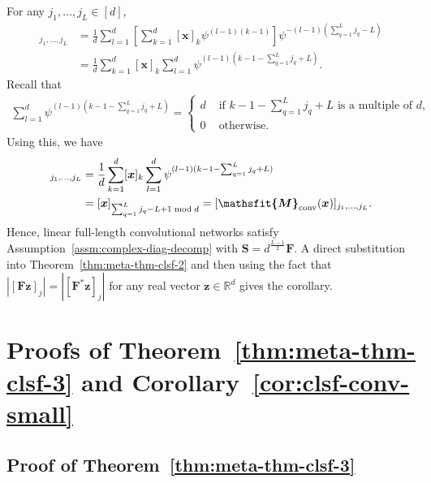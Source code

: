 \documentclass{article} %
\def\vx{{\bm{x}}}
\def\vz{{\bm{z}}}
\def\mF{{\bm{F}}}
\def\mS{{\bm{S}}}
\newcommand{\tens}[1]{\bm{\mathsfit{#1}}}
\def\tM{{\tens{M}}}
\newcommand{\R}{\mathbb{R}}
\newcommand{\tMconv}{\tM_{\rm conv}}
\begin{document}
For any $j_1, \dots, j_L \in [d]$,
\begin{align*}
    [\tM(\vx)]_{j_1, \dots, j_L} &= 
    \frac{1}{d} \sum_{l=1}^d \left [\sum_{k=1}^d [\vx]_k \psi^{(l-1)(k-1)} \right] \psi^{-(l-1)(\sum_{q=1}^L j_q - L)}\\
    &= \frac{1}{d} \sum_{k=1}^d [\vx]_k 
    \sum_{l=1}^d \psi^{(l-1)(k-1-\sum_{q=1}^L j_q + L)}.
\end{align*}
Recall that 
\begin{align*}
    \sum_{l=1}^d \psi^{(l-1)(k-1-\sum_{q=1}^L j_q + L)}
    = \begin{cases}
    d & \text{ if } k-1-\sum_{q=1}^L j_q + L \text{ is a multiple of $d$},\\
    0 & \text{ otherwise}.
    \end{cases}
\end{align*}
Using this, we have
\begin{align*}
    [\tM(\vx)]_{j_1, \dots, j_L} 
    &= \frac{1}{d} \sum_{k=1}^d [\vx]_k 
    \sum_{l=1}^d \psi^{(l-1)(k-1-\sum_{q=1}^L j_q + L)}\\
    &= [\vx]_{\sum_{q=1}^L j_q -L+1 \bmod d}
    = [\tMconv(\vx)]_{j_1, \dots, j_L}.
\end{align*}
Hence, linear full-length convolutional networks satisfy Assumption~\ref{assm:complex-diag-decomp} with $\mS = d^{\frac{L-1}{2}} \mF$. A direct substitution into Theorem~\ref{thm:meta-thm-clsf-2} and then using the fact that $|[\mF \vz]_j| = |[\mF^* \vz]_j|$ for any real vector $\vz \in \R^d$ gives the corollary.



\section{Proofs of Theorem~\ref{thm:meta-thm-clsf-3} and Corollary~\ref{cor:clsf-conv-small}}
\label{sec:proof-meta-thm-clsf-3}
\subsection{Proof of Theorem~\ref{thm:meta-thm-clsf-3}}
\end{document}
